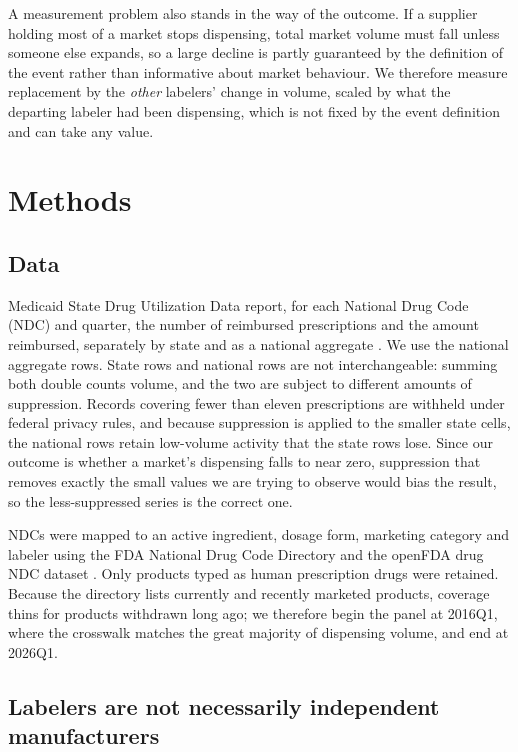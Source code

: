 \documentclass[pdflatex,sn-vancouver-num,Numbered]{sn-jnl}
\begin{document}
A measurement problem also stands in the way of the outcome. If a supplier holding most of a
market stops dispensing, total market volume must fall unless someone else expands, so a large
decline is partly guaranteed by the definition of the event rather than informative about market
behaviour. We therefore measure replacement by the \emph{other} labelers' change in volume,
scaled by what the departing labeler had been dispensing, which is not fixed by the event
definition and can take any value.

\section{Methods}\label{sec:methods}

\subsection{Data}\label{subsec:data}

Medicaid State Drug Utilization Data report, for each National Drug Code (NDC) and quarter, the
number of reimbursed prescriptions and the amount reimbursed, separately by state and as a
national aggregate \cite{cms_sdud}. We use the national aggregate rows. State rows and national
rows are not interchangeable: summing both double counts volume, and the two are subject to
different amounts of suppression. Records covering fewer than eleven prescriptions are withheld
under federal privacy rules, and because suppression is applied to the smaller state cells, the
national rows retain low-volume activity that the state rows lose. Since our outcome is whether a
market's dispensing falls to near zero, suppression that removes exactly the small values we are
trying to observe would bias the result, so the less-suppressed series is the correct one.

NDCs were mapped to an active ingredient, dosage form, marketing category and labeler using the
FDA National Drug Code Directory and the openFDA drug NDC dataset \cite{fda_ndc,openfda}. Only
products typed as human prescription drugs were retained. Because the directory lists currently
and recently marketed products, coverage thins for products withdrawn long ago; we therefore
begin the panel at 2016Q1, where the crosswalk matches the great majority of dispensing volume,
and end at 2026Q1.

\subsection{Labelers are not necessarily independent manufacturers}\label{subsec:labeler}
\end{document}

